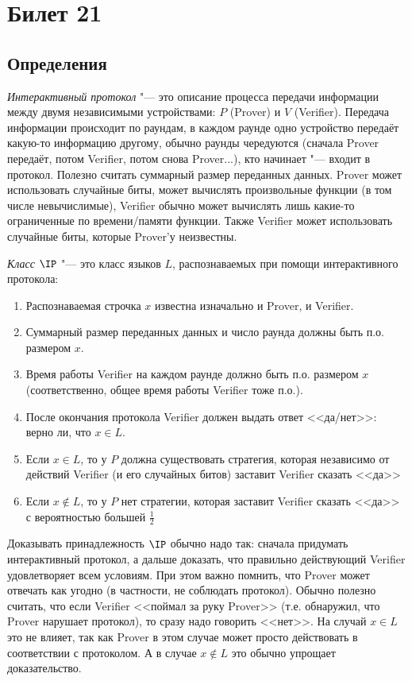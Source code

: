 \section{Билет 21}
\subsection{Определения}
	\begin{Def}
		\textit{Интерактивный протокол} "--- это описание процесса передачи информации между двумя независимыми устройствами: $P$ (Prover) и $V$ (Verifier).
		Передача информации происходит по раундам, в каждом раунде одно устройство передаёт какую-то информацию другому, обычно раунды чередуются
		(сначала Prover передаёт, потом Verifier, потом снова Prover...), кто начинает "--- входит в протокол.
		Полезно считать суммарный размер переданных данных.
		Prover может использовать случайные биты, может вычислять произвольные функции (в том числе невычислимые), Verifier обычно может вычислять лишь какие-то ограниченные по времени/памяти функции.
		Также Verifier может использовать случайные биты, которые Prover'у неизвестны.
	\end{Def}
	\begin{Def}
		\textit{Класс $\IP$} "--- это класс языков $L$, распознаваемых при помощи интерактивного протокола:
		\begin{enumerate}
			\item Распознаваемая строчка $x$ известна изначально и Prover, и Verifier.
			\item Суммарный размер переданных данных и число раунда должны быть п.о. размером $x$.
			\item Время работы Verifier на каждом раунде должно быть п.о. размером $x$ (соответственно, общее время работы Verifier тоже п.о.).
			\item После окончания протокола Verifier должен выдать ответ <<да/нет>>: верно ли, что $x \in L$.
			\item Если $x \in L$, то у $P$ должна существовать стратегия, которая независимо от действий Verifier (и его случайных битов) заставит Verifier сказать <<да>>
			\item Если $x \notin L$, то у $P$ нет стратегии, которая заставит Verifier сказать <<да>> с вероятностью большей $\frac 12$
		\end{enumerate}
	\end{Def}
	\begin{Rem}
		Доказывать принадлежность $\IP$ обычно надо так: сначала придумать интерактивный протокол, а дальше доказать, что правильно действующий Verifier удовлетворяет всем условиям.
		При этом важно помнить, что Prover может отвечать как угодно (в частности, не соблюдать протокол).
		Обычно полезно считать, что если Verifier <<поймал за руку Prover>> (т.е. обнаружил, что Prover нарушает протокол), то сразу надо говорить <<нет>>.
		На случай $x \in L$ это не влияет, так как Prover в этом случае может просто действовать в соответствии с протоколом.
		А в случае $x \notin L$ это обычно упрощает доказательство.
	\end{Rem}
